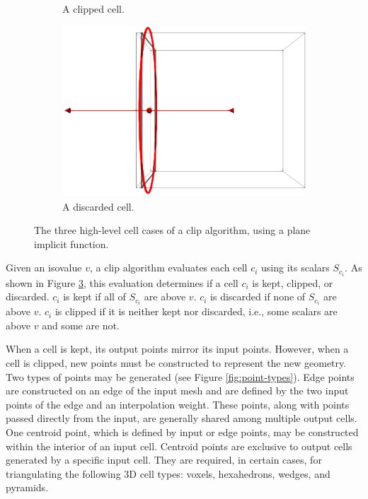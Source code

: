\documentclass{egpubl}
\begin{document}
\begin{figure}[h]
\begin{subfigure}[t]{0.32\linewidth}
    \caption{A clipped cell.}
    \label{fig:clipped-cell}
  \end{subfigure}
  \begin{subfigure}[t]{0.32\linewidth}
    \centering
    \includegraphics[width=\linewidth]{Figures/Discarded-Cell.png}
    \caption{A discarded cell.}
    \label{fig:discarded-cell}
  \end{subfigure}
  \caption{The three high-level cell cases of a clip algorithm, using a plane implicit function.}
  \label{fig:cell-cases}
\end{figure}

Given an isovalue $v$, a clip algorithm evaluates each cell $c_i$ using its scalars $S_{c_i}$. As shown in Figure \ref{fig:cell-cases}, this evaluation determines if a cell $c_i$ is kept, clipped, or discarded.
$c_i$ is kept if
all of $S_{c_i}$ are above $v$.
$c_i$ is discarded if
none of $S_{c_i}$ are above $v$.
$c_i$ is clipped if
it is neither kept nor discarded, i.e., some scalars are above $v$ and some are not.

When a cell is kept, its output points mirror its input points. However, when a cell is clipped, new points must be constructed to represent the new geometry. Two types of points may be generated (see Figure \ref{fig:point-types}). Edge points are constructed on an edge of the input mesh and are defined by the two input points of the edge and an interpolation weight. These points, along with points passed directly from the input, are generally shared among multiple output cells. One centroid point, which is defined by input or edge points, may be constructed within the interior of an input cell. Centroid points are exclusive to output cells generated by a specific input cell. They are required, in certain cases, for triangulating the following 3D cell types: voxels, hexahedrons, wedges, and pyramids.
\end{document}

